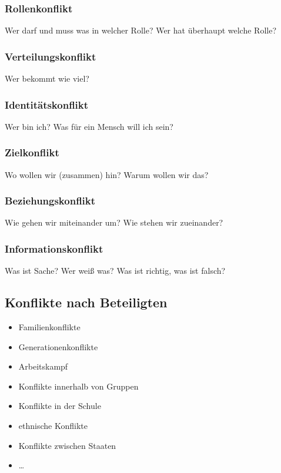 \subsubsection{Rollenkonflikt}

Wer darf und muss was in welcher Rolle? Wer hat überhaupt welche Rolle?

\subsubsection{Verteilungskonflikt}

Wer bekommt wie viel?

\subsubsection{Identitätskonflikt}

Wer bin ich? Was für ein Mensch will ich sein?

\subsubsection{Zielkonflikt}

Wo wollen wir (zusammen) hin? Warum wollen wir das?

\subsubsection{Beziehungskonflikt}

Wie gehen wir miteinander um? Wie stehen wir zueinander?

\subsubsection{Informationskonflikt}

Was ist Sache? Wer weiß was? Was ist richtig, was ist falsch?


\subsection{Konflikte nach Beteiligten}

\begin{itemize}
  \item Familienkonflikte
  \item Generationenkonflikte
  \item Arbeitskampf
  \item Konflikte innerhalb von Gruppen
  \item Konflikte in der Schule
  \item ethnische Konflikte
  \item Konflikte zwischen Staaten
  \item \ldots
\end{itemize}


